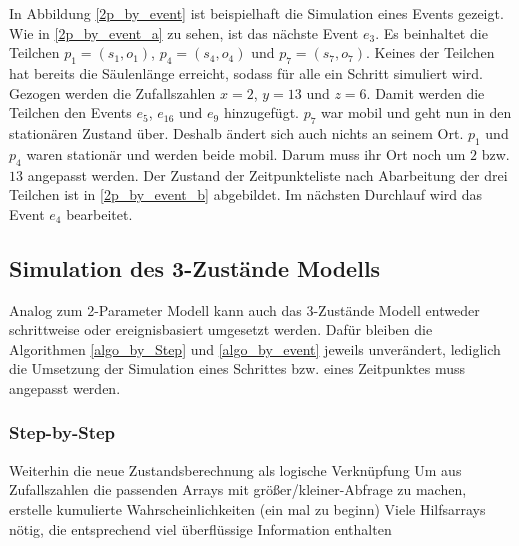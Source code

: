 In Abbildung \ref{2p_by_event} ist beispielhaft die Simulation eines Events gezeigt. Wie in \ref{2p_by_event_a} zu sehen, ist das nächste Event $e_3$. Es beinhaltet die Teilchen $p_1 = (s_1, o_1)$, $p_4 = (s_4, o_4)$ und $p_7 = (s_7, o_7)$. Keines der Teilchen hat bereits die Säulenlänge erreicht, sodass für alle ein Schritt simuliert wird. Gezogen werden die Zufallszahlen $x=2$, $y=13$ und $z=6$. Damit werden die Teilchen den Events $e_5$, $e_{16}$ und $e_9$ hinzugefügt. $p_{7}$ war mobil und geht nun in den stationären Zustand über. Deshalb ändert sich auch nichts an seinem Ort. $p_1$ und $p_4$ waren stationär und werden beide mobil. Darum muss ihr Ort noch um $2$ bzw. $13$ angepasst werden. Der Zustand der Zeitpunkteliste nach Abarbeitung der drei Teilchen ist in \ref{2p_by_event_b} abgebildet. Im nächsten Durchlauf wird das Event $e_4$ bearbeitet.

\subsection{Simulation des 3-Zustände Modells}

Analog zum 2-Parameter Modell kann auch das 3-Zustände Modell entweder schrittweise oder ereignisbasiert umgesetzt werden. Dafür bleiben die Algorithmen \ref{algo_by_Step} und \ref{algo_by_event} jeweils unverändert, lediglich die Umsetzung der Simulation eines Schrittes bzw. eines Zeitpunktes muss angepasst werden.

\subsubsection{Step-by-Step}
Weiterhin die neue Zustandsberechnung als logische Verknüpfung
Um aus Zufallszahlen die passenden Arrays mit größer/kleiner-Abfrage zu machen, erstelle kumulierte Wahrscheinlichkeiten (ein mal zu beginn)
Viele Hilfsarrays nötig, die entsprechend viel überflüssige Information enthalten


